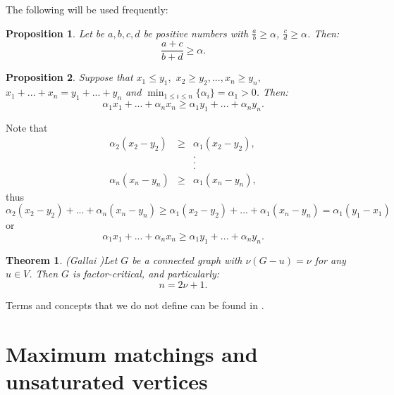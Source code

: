 \documentclass[fleqn,12pt,twoside]{article}
\newtheorem{theorem}{Theorem}
\newtheorem{proposition}{Proposition}
\newenvironment{proof}[1][Proof.]{\begin{trivlist}
\item[\hskip \labelsep {\bfseries #1}]}{\end{trivlist}}
\begin{document}
The following will be used frequently:

\begin{proposition}
\label{FractionInequality}Let be $a,b,c,d$ be positive numbers with $\frac{a}{b}\geq \alpha $, $\frac{c}{d}\geq \alpha $. Then:\begin{equation}
\frac{a+c}{b+d}\geq \alpha.
\end{equation}
\end{proposition}

\begin{proposition}
\label{LinearInequality}Suppose that $x_{1}\leq y_{1},$ $x_{2}\geq
y_{2},...,x_{n}\geq y_{n},$ $x_{1}+...+x_{n}=y_{1}+...+y_{n}$ and ${\min }_{{1\leq i\leq n}}\{\alpha _{i}\}=\alpha _{1}>0$. Then:\begin{equation}
\alpha _{1}x_{1}+...+\alpha _{n}x_{n}\geq \alpha
_{1}y_{1}+...+\alpha _{n}y_{n}.
\end{equation}
\end{proposition}

\begin{proof}
Note that
\begin{eqnarray*}
\alpha _{2}(x_{2}-y_{2}) &\geq &\alpha _{1}(x_{2}-y_{2}), \\
&&. \\
&&. \\
&&. \\
\alpha _{n}(x_{n}-y_{n}) &\geq &\alpha _{1}(x_{n}-y_{n}),
\end{eqnarray*}thus
\begin{equation}
\alpha _{2}(x_{2}-y_{2})+...+\alpha _{n}(x_{n}-y_{n})\geq \alpha
_{1}(x_{2}-y_{2})+...+\alpha _{1}(x_{n}-y_{n})=\alpha
_{1}(y_{1}-x_{1})
\end{equation}or\begin{equation}
\alpha _{1}x_{1}+...+\alpha _{n}x_{n}\geq \alpha
_{1}y_{1}+...+\alpha _{n}y_{n}.
\end{equation}
\end{proof}

\begin{theorem}\label{Gallai}(Gallai \cite{Lov})Let $G$ be a connected graph
with $\nu(G-u)=\nu$ for any $u\in V$. Then $G$ is factor-critical,
and particularly:
\begin{equation*}
n=2\nu+1.
\end{equation*}
\end{theorem}
Terms and concepts that we do not define can be found in
\cite{Harary,Lov,West}.

\section{Maximum matchings and unsaturated vertices}
\end{document}
